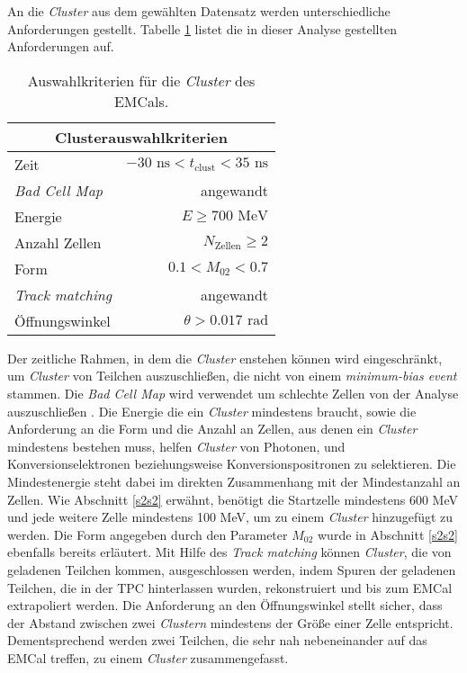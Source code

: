 An die \textit{Cluster} aus dem gewählten Datensatz werden unterschiedliche Anforderungen gestellt.
Tabelle \ref{tab:Cluster} listet die in dieser Analyse gestellten Anforderungen auf.
\begin{table}[b]
\centering
\begin{tabular}{|l|r|}
\hline
\multicolumn{2}{|c|}{Clusterauswahlkriterien}                   \\ \hline \hline
Zeit                    & $-30\text{ ns} < t_\text{clust}<35\text{ ns}$ \\ \hline
\textit{Bad Cell Map}   & angewandt                                     \\ \hline
Energie                 & $E\geq700\text{ MeV}$                         \\ \hline
Anzahl Zellen           & $N_\text{Zellen}\geq 2$                       \\ \hline
Form                    & $0.1< M_{02}<0.7$                             \\ \hline
\textit{Track matching} & angewandt                                     \\ \hline
Öffnungswinkel          & $\theta>0.017\text{ rad}$                     \\ \hline
\end{tabular}
\caption{Auswahlkriterien für die \textit{Cluster} des EMCals.}
\label{tab:Cluster}
\end{table}
\newline
Der zeitliche Rahmen, in dem die \textit{Cluster} enstehen können wird eingeschränkt, um \textit{Cluster} von Teilchen auszuschließen, die nicht von einem \textit{minimum-bias event} stammen.
Die \textit{Bad Cell Map} wird verwendet um schlechte Zellen von der Analyse auszuschließen \cite{thesis:Joshua}.
\newline
Die Energie die ein \textit{Cluster} mindestens braucht, sowie die Anforderung an die Form und die Anzahl an Zellen, aus denen ein \textit{Cluster} mindestens bestehen muss, helfen \textit{Cluster} von Photonen, und Konversionselektronen beziehungsweise Konversionspositronen zu selektieren.
Die Mindestenergie steht dabei im direkten Zusammenhang mit der Mindestanzahl an Zellen.
Wie Abschnitt \ref{s2s2} erwähnt, benötigt die Startzelle mindestens 600 MeV und jede weitere Zelle mindestens 100 MeV, um zu einem \textit{Cluster} hinzugefügt zu werden.
Die Form angegeben durch den Parameter $M_{02}$ wurde in Abschnitt \ref{s2s2} ebenfalls bereits erläutert.
Mit Hilfe des \textit{Track matching} können \textit{Cluster}, die von geladenen Teilchen kommen, ausgeschlossen werden, indem Spuren der geladenen Teilchen, die in der TPC hinterlassen wurden, rekonstruiert und bis zum EMCal extrapoliert werden.
\newline
Die Anforderung an den Öffnungswinkel stellt sicher, dass der Abstand zwischen zwei \textit{Clustern} mindestens der Größe einer Zelle entspricht.
Dementsprechend werden zwei Teilchen, die sehr nah nebeneinander auf das EMCal treffen, zu einem \textit{Cluster} zusammengefasst.